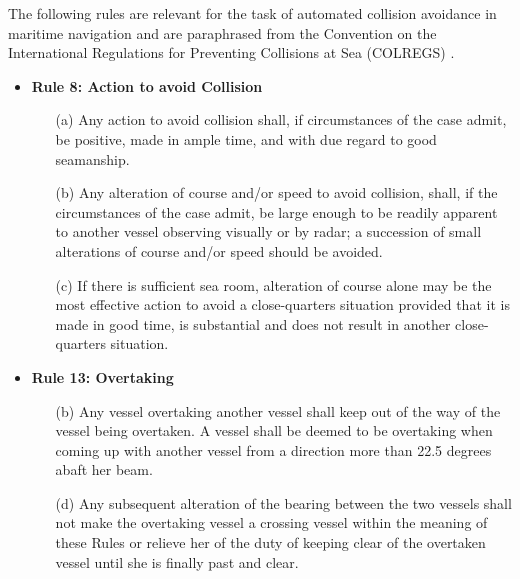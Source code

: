 The following rules are relevant for the task of automated collision avoidance in maritime navigation and are paraphrased from the Convention on the International Regulations for Preventing Collisions at Sea (COLREGS) \citep{COLREGS}.



\begin{itemize}
    \item \textbf{Rule 8: Action to avoid Collision}
        \begin{enumerate}
            \item[(a)] Any action to avoid collision shall, if circumstances of the case admit, be positive, made in ample time, and with due regard to good seamanship.
            \item[(b)] Any alteration of course and/or speed to avoid collision, shall, if the circumstances of the case admit, be large enough to be readily apparent to another vessel observing visually or by radar; a succession of small alterations of course and/or speed should be avoided.
            \item[(c)] If there is sufficient sea room, alteration of course alone may be the most effective action to avoid
            a close-quarters situation provided that it is made in good time, is substantial and does not result in
            another close-quarters situation.
        \end{enumerate}
    \item \textbf{Rule 13: Overtaking }
        \begin{enumerate}
            \item[(b)] Any vessel overtaking another vessel shall keep out of the way of the vessel being overtaken. A vessel shall be deemed to be overtaking when coming up with another vessel from a direction more than 22.5 degrees abaft her beam.
            \item[(d)] Any subsequent alteration of the bearing between the two vessels shall not make the overtaking vessel a crossing vessel within the meaning of these Rules or relieve her of the duty of keeping clear of the overtaken vessel until she is finally past and clear.

\end{enumerate}
\end{itemize}
